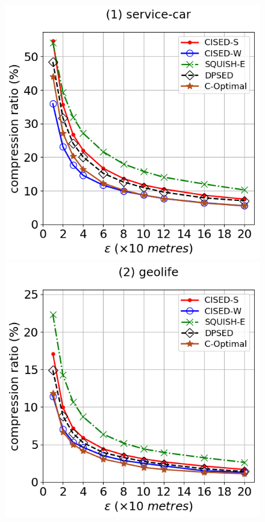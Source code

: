 {\begin{figure}[tb!]
\centering
\includegraphics[scale = 0.290]{Figures/Exp-opt-CR-epsilon-service.png}\hspace{1ex}
\includegraphics[scale = 0.290]{Figures/Exp-opt-CR-epsilon-geolife.png}\hspace{1ex}

\end{figure}}
